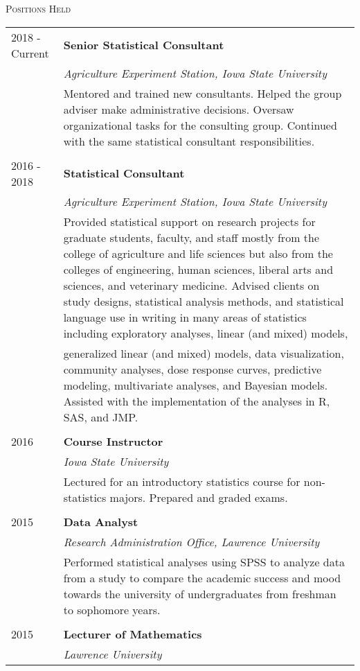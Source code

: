 \documentclass[10pt, oneside]{article}
\begin{document}
\noindent \textsc{Positions Held} \hrulefill
\begin{longtable}{p{2.5cm}p{14cm}}
\hfill{2018 - Current} & \textbf{Senior Statistical Consultant}\\
& \emph{Agriculture Experiment Station, Iowa State University}\\
& Mentored and trained new consultants. Helped the group adviser make administrative decisions. Oversaw organizational tasks for the consulting group. Continued with the same statistical consultant responsibilities.\\
\\
\hfill{2016 - 2018} & \textbf{Statistical Consultant}\\
& \emph{Agriculture Experiment Station, Iowa State University}\\
& Provided statistical support on research projects for graduate students, faculty, and staff mostly from the college of agriculture and life sciences but also from the colleges of engineering, human sciences, liberal arts and sciences, and veterinary medicine. Advised clients on study designs, statistical analysis methods, and statistical language use in writing in many areas of statistics including exploratory analyses, linear (and mixed) models, \\
& generalized linear (and mixed) models, data visualization, community analyses, dose response curves, predictive modeling, multivariate analyses, and Bayesian models. Assisted with the implementation of the analyses in R, SAS, and JMP.\\
\\
\hfill{2016} & \textbf{Course Instructor}\\
& \emph{Iowa State University}\\
& Lectured for an introductory statistics course for non-statistics majors. Prepared and graded exams.\\
\\
\hfill{2015} & \textbf{Data Analyst}\\
& \emph{Research Administration Office, Lawrence University}\\
& Performed statistical analyses using SPSS to analyze data from a study to compare the academic success and mood towards the university of undergraduates from freshman to sophomore years.\\
\\
\hfill{2015} & \textbf{Lecturer of Mathematics}\\
& \emph{Lawrence University}\\

\end{longtable}
\end{document}
